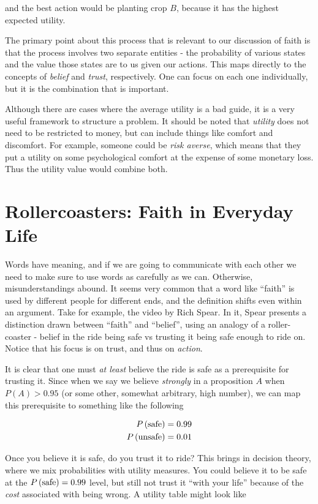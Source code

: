 \documentclass{tufte-book}
\begin{document}
and the best action would be planting crop \(B\), because it has the
highest expected utility.

The primary point about this process that is relevant to our discussion
of faith is that the process involves two separate entities - the
probability of various states and the value those states are to us given
our actions. This maps directly to the concepts of \emph{belief} and
\emph{trust}, respectively. One can focus on each one individually, but
it is the combination that is important.

Although there are cases where the average utility is a bad guide, it is
a very useful framework to structure a problem. It should be noted that
\emph{utility} does not need to be restricted to money, but can include
things like comfort and discomfort. For example, someone could be
\emph{risk averse}, which means that they put a utility on some
psychological comfort at the expense of some monetary loss. Thus the
utility value would combine both.

\section{Rollercoasters: Faith in Everyday
Life}\label{rollercoasters-faith-in-everyday-life}

Words have meaning, and if we are going to communicate with each other
we need to make sure to use words as carefully as we can. Otherwise,
misunderstandings abound. It seems very common that a word like
``faith'' is used by different people for different ends, and the
definition shifts even within an argument. Take for example, the video
by Rich Spear\citep{Spear:2013aa}. In it, Spear presents a distinction
drawn between ``faith'' and ``belief'', using an analogy of a
roller-coaster - belief in the ride being safe vs trusting it being safe
enough to ride on. Notice that his focus is on trust, and thus on
\emph{action}.

It is clear that one must \emph{at least} believe the ride is safe as a
prerequisite for trusting it. Since when we say we believe
\emph{strongly} in a proposition \(A\) when \(P(A)>0.95\) (or some
other, somewhat arbitrary, high number), we can map this prerequisite to
something like the following

\begin{eqnarray*}
\P{safe} = 0.99 \\
\P{unsafe} = 0.01
\end{eqnarray*}

Once you believe it is safe, do you trust it to ride? This brings in
decision theory, where we mix probabilities with utility measures. You
could believe it to be safe at the \(\P{safe} = 0.99\) level, but still
not trust it ``with your life'' because of the \emph{cost} associated
with being wrong. A utility table might look like
\end{document}
